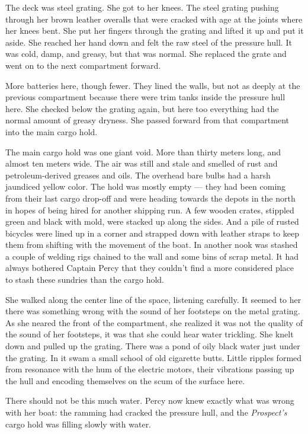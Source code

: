 \documentclass[]{article}
\begin{document}
\begin{multicols}{2}
The deck was steel grating. She got to her knees. The steel grating
pushing through her brown leather overalls that were cracked with age at
the joints where her knees bent. She put her fingers through the grating
and lifted it up and put it aside. She reached her hand down and felt
the raw steel of the pressure hull. It was cold, damp, and greasy, but
that was normal. She replaced the grate and went on to the next
compartment forward.

More batteries here, though fewer. They lined the walls, but not as
deeply at the previous compartment because there were trim tanks inside
the pressure hull here. She checked below the grating again, but here
too everything had the normal amount of greasy dryness. She passed
forward from that compartment into the main cargo hold.

The main cargo hold was one giant void. More than thirty meters long,
and almost ten meters wide. The air was still and stale and smelled of
rust and petroleum-derived greases and oils. The overhead bare bulbs had
a harsh jaundiced yellow color. The hold was mostly empty --- they had
been coming from their last cargo drop-off and were heading towards the
depots in the north in hopes of being hired for another shipping run. A
few wooden crates, stippled green and black with mold, were stacked up
along the sides. And a pile of rusted bicycles were lined up in a corner
and strapped down with leather straps to keep them from shifting with
the movement of the boat. In another nook was stashed a couple of
welding rigs chained to the wall and some bins of scrap metal. It had
always bothered Captain Percy that they couldn't find a more considered
place to stash these sundries than the cargo hold.

She walked along the center line of the space, listening carefully. It
seemed to her there was something wrong with the sound of her footsteps
on the metal grating. As she neared the front of the compartment, she
realized it was not the quality of the sound of her footsteps, it was
that she could hear water trickling. She knelt down and pulled up the
grating. There was a pond of oily black water just under the grating. In
it swam a small school of old cigarette butts. Little ripples formed
from resonance with the hum of the electric motors, their vibrations
passing up the hull and encoding themselves on the scum of the surface
here.

There should not be this much water. Percy now knew exactly what was
wrong with her boat: the ramming had cracked the pressure hull, and the
\emph{Prospect's} cargo hold was filling slowly with water.


\end{multicols}
\end{document}
